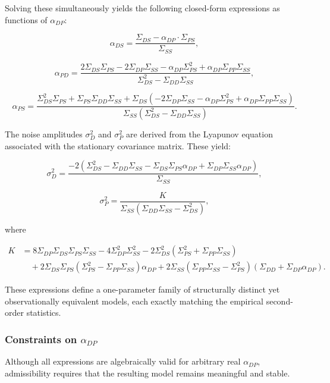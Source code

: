 \documentclass[
]{article}
\begin{document}
Solving these simultaneously yields the following closed-form
expressions as functions of \(\alpha_{DP}\):

\[
\alpha_{DS} = \frac{\Sigma_{DS} - \alpha_{DP} \cdot \Sigma_{PS}}{\Sigma_{SS}},
\]

\[
\alpha_{PD} = \frac{2 \Sigma_{DS} \Sigma_{PS} - 2 \Sigma_{DP} \Sigma_{SS} - \alpha_{DP} \Sigma_{PS}^2 + \alpha_{DP} \Sigma_{PP} \Sigma_{SS}}{\Sigma_{DS}^2 - \Sigma_{DD} \Sigma_{SS}},
\]

\[
\alpha_{PS} = \frac{
\Sigma_{DS}^2 \Sigma_{PS}
+ \Sigma_{PS} \Sigma_{DD} \Sigma_{SS}
+ \Sigma_{DS}(-2 \Sigma_{DP} \Sigma_{SS} - \alpha_{DP} \Sigma_{PS}^2 + \alpha_{DP} \Sigma_{PP} \Sigma_{SS})
}{
\Sigma_{SS}(\Sigma_{DS}^2 - \Sigma_{DD} \Sigma_{SS})
}.
\]

The noise amplitudes \(\sigma_D^2\) and \(\sigma_P^2\) are derived from
the Lyapunov equation associated with the stationary covariance matrix.
These yield:

\[
\sigma_D^2 = \frac{-2 \left(\Sigma_{DS}^2 - \Sigma_{DD} \Sigma_{SS} - \Sigma_{DS} \Sigma_{PS} \alpha_{DP} + \Sigma_{DP} \Sigma_{SS} \alpha_{DP} \right)}{\Sigma_{SS}},
\]

\[
\sigma_P^2 = \frac{K}{\Sigma_{SS} (\Sigma_{DD} \Sigma_{SS} - \Sigma_{DS}^2)},
\]

where

\[
\begin{aligned}
K &= 8 \Sigma_{DP} \Sigma_{DS} \Sigma_{PS} \Sigma_{SS}
- 4 \Sigma_{DP}^2 \Sigma_{SS}^2
- 2 \Sigma_{DS}^2 (\Sigma_{PS}^2 + \Sigma_{PP} \Sigma_{SS}) \\
&\quad + 2 \Sigma_{DS} \Sigma_{PS} (\Sigma_{PS}^2 - \Sigma_{PP} \Sigma_{SS}) \alpha_{DP}
+ 2 \Sigma_{SS} (\Sigma_{PP} \Sigma_{SS} - \Sigma_{PS}^2)(\Sigma_{DD} + \Sigma_{DP} \alpha_{DP}).
\end{aligned}
\]

These expressions define a one-parameter family of structurally distinct
yet observationally equivalent models, each exactly matching the
empirical second-order statistics.

\subsubsection{\texorpdfstring{Constraints on
\(\alpha_{DP}\)}{Constraints on \textbackslash alpha\_\{DP\}}}\label{constraints-on-alpha_dp}

Although all expressions are algebraically valid for arbitrary real
\(\alpha_{DP}\), admissibility requires that the resulting model remains
meaningful and stable.
\end{document}
